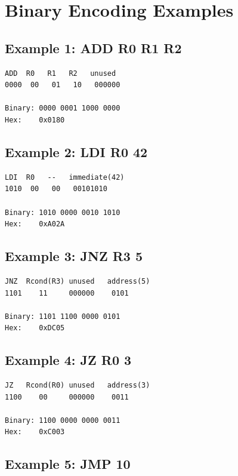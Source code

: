 \documentclass[11pt,a4paper]{article}
\begin{document}
\section{Binary Encoding Examples}

\subsection{Example 1: ADD R0 R1 R2}

\begin{lstlisting}[language={}]
ADD  R0   R1   R2   unused
0000  00   01   10   000000

Binary: 0000 0001 1000 0000
Hex:    0x0180
\end{lstlisting}

\subsection{Example 2: LDI R0 42}

\begin{lstlisting}[language={}]
LDI  R0   --   immediate(42)
1010  00   00   00101010

Binary: 1010 0000 0010 1010
Hex:    0xA02A
\end{lstlisting}

\subsection{Example 3: JNZ R3 5}

\begin{lstlisting}[language={}]
JNZ  Rcond(R3) unused   address(5)
1101    11     000000    0101

Binary: 1101 1100 0000 0101
Hex:    0xDC05
\end{lstlisting}

\subsection{Example 4: JZ R0 3}

\begin{lstlisting}[language={}]
JZ   Rcond(R0) unused   address(3)
1100    00     000000    0011

Binary: 1100 0000 0000 0011
Hex:    0xC003
\end{lstlisting}

\subsection{Example 5: JMP 10}
\end{document}
